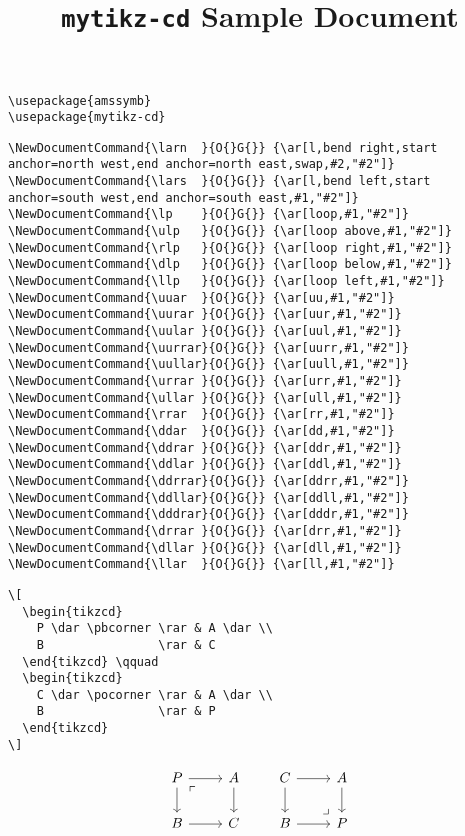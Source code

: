 \documentclass{article}
\begin{document}
\title{\texttt{mytikz-cd} Sample Document}
\author{}
\date{}

\maketitle

\begin{verbatim}
\usepackage{amssymb}
\usepackage{mytikz-cd}
\end{verbatim}

\begin{verbatim}
\NewDocumentCommand{\larn  }{O{}G{}} {\ar[l,bend right,start anchor=north west,end anchor=north east,swap,#2,"#2"]}
\NewDocumentCommand{\lars  }{O{}G{}} {\ar[l,bend left,start anchor=south west,end anchor=south east,#1,"#2"]}
\NewDocumentCommand{\lp    }{O{}G{}} {\ar[loop,#1,"#2"]}
\NewDocumentCommand{\ulp   }{O{}G{}} {\ar[loop above,#1,"#2"]}
\NewDocumentCommand{\rlp   }{O{}G{}} {\ar[loop right,#1,"#2"]}
\NewDocumentCommand{\dlp   }{O{}G{}} {\ar[loop below,#1,"#2"]}
\NewDocumentCommand{\llp   }{O{}G{}} {\ar[loop left,#1,"#2"]}
\NewDocumentCommand{\uuar  }{O{}G{}} {\ar[uu,#1,"#2"]}
\NewDocumentCommand{\uurar }{O{}G{}} {\ar[uur,#1,"#2"]}
\NewDocumentCommand{\uular }{O{}G{}} {\ar[uul,#1,"#2"]}
\NewDocumentCommand{\uurrar}{O{}G{}} {\ar[uurr,#1,"#2"]}
\NewDocumentCommand{\uullar}{O{}G{}} {\ar[uull,#1,"#2"]}
\NewDocumentCommand{\urrar }{O{}G{}} {\ar[urr,#1,"#2"]}
\NewDocumentCommand{\ullar }{O{}G{}} {\ar[ull,#1,"#2"]}
\NewDocumentCommand{\rrar  }{O{}G{}} {\ar[rr,#1,"#2"]}
\NewDocumentCommand{\ddar  }{O{}G{}} {\ar[dd,#1,"#2"]}
\NewDocumentCommand{\ddrar }{O{}G{}} {\ar[ddr,#1,"#2"]}
\NewDocumentCommand{\ddlar }{O{}G{}} {\ar[ddl,#1,"#2"]}
\NewDocumentCommand{\ddrrar}{O{}G{}} {\ar[ddrr,#1,"#2"]}
\NewDocumentCommand{\ddllar}{O{}G{}} {\ar[ddll,#1,"#2"]}
\NewDocumentCommand{\dddrar}{O{}G{}} {\ar[dddr,#1,"#2"]}
\NewDocumentCommand{\drrar }{O{}G{}} {\ar[drr,#1,"#2"]}
\NewDocumentCommand{\dllar }{O{}G{}} {\ar[dll,#1,"#2"]}
\NewDocumentCommand{\llar  }{O{}G{}} {\ar[ll,#1,"#2"]}
\end{verbatim}

\begin{verbatim}
\[
  \begin{tikzcd}
    P \dar \pbcorner \rar & A \dar \\
    B                \rar & C
  \end{tikzcd} \qquad
  \begin{tikzcd}
    C \dar \pocorner \rar & A \dar \\
    B                \rar & P
  \end{tikzcd}
\]
\end{verbatim}
%
\[
  \begin{tikzcd}
    P \dar \pbcorner \rar & A \dar \\
    B                \rar & C
  \end{tikzcd} \qquad
  \begin{tikzcd}
    C \dar \pocorner \rar & A \dar \\
    B                \rar & P
  \end{tikzcd}
\]
\end{document}
